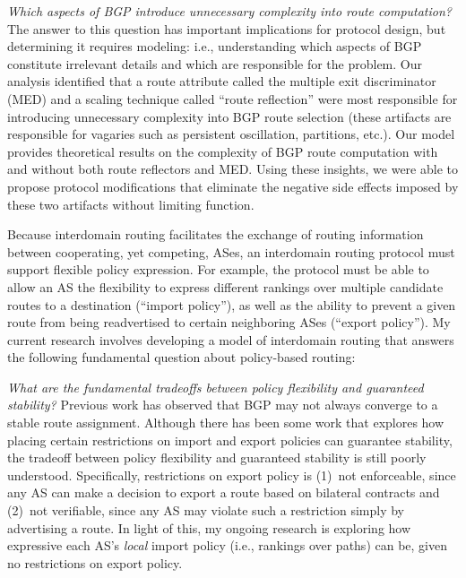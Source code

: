 
{\em Which aspects of BGP introduce unnecessary complexity into route
  computation?}  The answer to this question has important implications
  for protocol design, but determining it requires modeling: i.e.,
  understanding which aspects of BGP constitute irrelevant details and
  which are responsible for the problem.  Our analysis identified
  that a route attribute called the multiple exit discriminator (MED)
  and a scaling technique called ``route reflection'' were most
  responsible for introducing unnecessary complexity into BGP route
  selection (these artifacts are responsible for vagaries such as
  persistent oscillation, partitions, etc.).  Our model provides
  theoretical results on the complexity of BGP route computation with
  and without both route reflectors and MED.  Using these insights, we
  were able to propose protocol modifications that eliminate the
  negative side effects imposed by these two artifacts without limiting
  function.

Because interdomain routing facilitates the exchange of routing
information between cooperating, yet competing, ASes, an interdomain
routing protocol must support flexible policy expression.  For example,
the protocol must be able to allow an AS the flexibility to express
different rankings over multiple candidate routes to a destination
(``import policy''), as well as the ability to prevent a given route
from being readvertised to certain neighboring ASes (``export
policy'').  My current research involves developing a model of
interdomain routing that answers the following fundamental question
about policy-based routing:

{\em What are the fundamental tradeoffs between policy flexibility and
  guaranteed stability?}  Previous work has observed that BGP may not
  always converge to a stable route assignment.  Although there has been
  some work that explores how placing certain restrictions on import and
  export policies can guarantee stability, the tradeoff between policy
  flexibility and guaranteed stability is still poorly understood.
  Specifically, restrictions on export policy is (1)~not enforceable,
  since any AS can make a decision to export a route based on bilateral
  contracts and (2)~not verifiable, since any AS may violate such a
  restriction simply by advertising a route.  In light of this, my
  ongoing research is exploring how expressive each AS's {\em local}
  import policy (i.e., rankings over paths) can be, given no
  restrictions on export policy.
